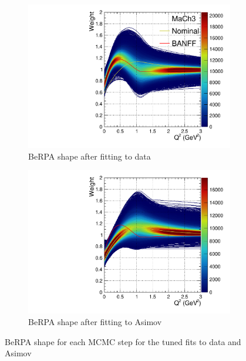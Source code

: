 \begin{figure}[h]
	\begin{subfigure}[t]{0.49\textwidth}
		\includegraphics[width=\textwidth, trim={0mm 0mm 0mm 0mm}, clip,page=1]{figures/mach3/data/2017b_NewDet_3Xsec_4Det_5Flux_NewXSecTune_Data_0_BeRPA}
		\caption{BeRPA shape after fitting to data}
	\end{subfigure}
	\begin{subfigure}[t]{0.49\textwidth}
		\includegraphics[width=\textwidth, trim={0mm 0mm 0mm 0mm}, clip,page=1]{figures/mach3/data/2017b_NewDet_3Xsec_4Det_5Flux_NewXSecTune_Asimov_0_BeRPA}
		\caption{BeRPA shape after fitting to Asimov}
	\end{subfigure}
\caption{BeRPA shape for each MCMC step for the tuned fits to data and Asimov}
\label{fig:berpa_data}
\end{figure}


